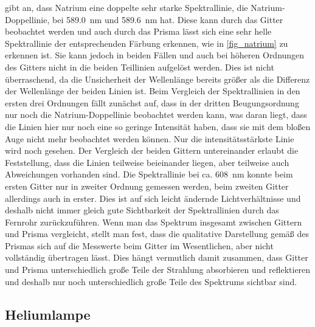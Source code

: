 \documentclass[
	a4paper,
	12pt,
	pagesize,
	ngerman
]{scrartcl}
\begin{document}
	\cite{NatriumDoppel} gibt an, dass Natrium eine doppelte sehr starke Spektrallinie, die Natrium-Doppellinie, bei \SI{589,0}{\nano \meter} und \SI{589,6}{\nano \meter} hat.
	Diese kann durch das Gitter beobachtet werden und auch durch das Prisma lässt sich eine sehr helle Spektrallinie der entsprechenden Färbung erkennen, wie in \cref{fig_natrium} zu erkennen ist.
	Sie kann jedoch in beiden Fällen und auch bei höheren Ordnungen des Gitters nicht in die beiden Teillinien aufgelöst werden.
	Dies ist nicht überraschend, da die Unsicherheit der Wellenlänge bereits größer als die Differenz der Wellenlänge der beiden Linien ist. %
	Beim Vergleich der Spektrallinien in den ersten drei Ordnungen fällt zunächst auf, dass in der dritten Beugungsordnung nur noch die Natrium-Doppellinie beobachtet werden kann, was daran liegt, dass die Linien hier nur noch eine so geringe Intensität haben, dass sie mit dem bloßen Auge nicht mehr beobachtet werden können.
	Nur die intensitätsstärkste Linie wird noch gesehen.
	Der Vergleich der beiden Gittern untereinander erlaubt die Feststellung, dass die Linien teilweise beieinander liegen, aber teilweise auch Abweichungen vorhanden sind.
	Die Spektrallinie bei ca. \SI{608}{\nano \meter} konnte beim ersten Gitter nur in zweiter Ordnung gemessen werden, beim zweiten Gitter allerdings auch in erster.
	Dies ist auf sich leicht ändernde Lichtverhältnisse und deshalb nicht immer gleich gute Sichtbarkeit der Spektrallinien durch das Fernrohr zurückzuführen.
	Wenn man das Spektrum insgesamt zwischen Gittern und Prisma vergleicht, stellt man fest, dass die qualitative Darstellung gemäß des Prismas sich auf die Messwerte beim Gitter im Wesentlichen, aber nicht vollständig übertragen lässt.
	Dies hängt vermutlich damit zusammen, dass Gitter und Prisma unterschiedlich große Teile der Strahlung absorbieren und reflektieren und deshalb nur noch unterschiedlich große Teile des Spektrums sichtbar sind.
	
	
	\subsection{Heliumlampe} \label{ss_helium}
\end{document}
